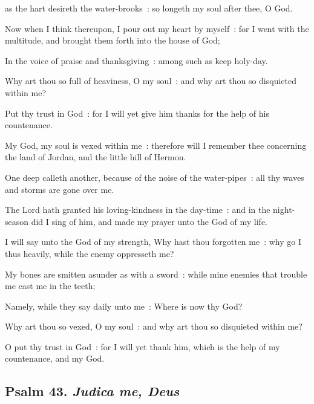  as the hart desireth the water-brooks~: so longeth my soul after thee, O God.\par
{}
Now when I think thereupon, I pour out my heart by myself~: for I went with the multitude, and brought them forth into the house of God;\par
{}In the voice of praise and thanksgiving~: among such as keep holy-day.\par
{}Why art thou so full of heaviness, O my soul~: and why art thou so disquieted within me?\par
{}Put thy trust in God~: for I will yet give him thanks for the help of his countenance.\par
{}My God, my soul is vexed within me~: therefore will I remember thee concerning the land of Jordan, and the little hill of Hermon.\par
{}One deep calleth another, because of the noise of the water-pipes~: all thy waves and storms are gone over me.\par
{}The Lord hath granted his loving-kindness in the day-time~: and in the night-season did I sing of him, and made my prayer unto the God of my life.\par
{}I will say unto the God of my strength, Why hast thou forgotten me~: why go I thus heavily, while the enemy oppresseth me?\par
{}My bones are smitten asunder as with a sword~: while mine enemies that trouble me cast me in the teeth;\par
{}Namely, while they say daily unto me~: Where is now thy God?\par
{}Why art thou so vexed, O my soul~: and why art thou so disquieted within me?\par
{}O put thy trust in God~: for I will yet thank him, which is the help of my countenance, and my God.\par

\subsection{Psalm 43. \textit{Judica me, Deus}}

